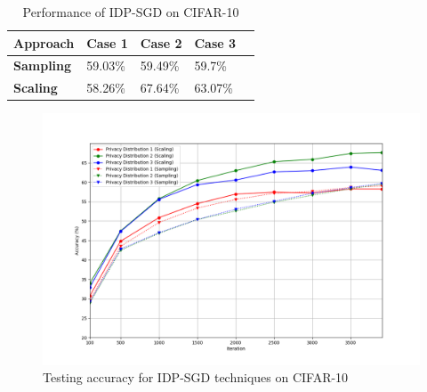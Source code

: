 \begin{table}[!htp]\centering
\caption{Performance of IDP-SGD on CIFAR-10}\label{tab: accIDP}
\scriptsize
\begin{tabular}{|p{1.7cm}|p{1.7cm}|p{1.7cm}|p{1.7cm}|p{1.7cm}|}\toprule
\hline
\textbf{Approach}  &\textbf{Case 1}&\textbf{Case 2}&\textbf{Case 3}\\\midrule
\hline
\textbf{Sampling}  & 59.03\% & 59.49\% & 59.7\% \\
\hline
\textbf{Scaling} & 58.26\% & 67.64\% & 63.07\% \\
\hline
\bottomrule
\end{tabular}
\end{table}
\begin{figure}[h]
\centering
        \includegraphics[width=\linewidth]{submissions/submission5/figs/cifarindivid.png}
   \caption{Testing accuracy for IDP-SGD techniques on CIFAR-10}\label{FigDiff}
   \label{accidpcifar}
\end{figure} 